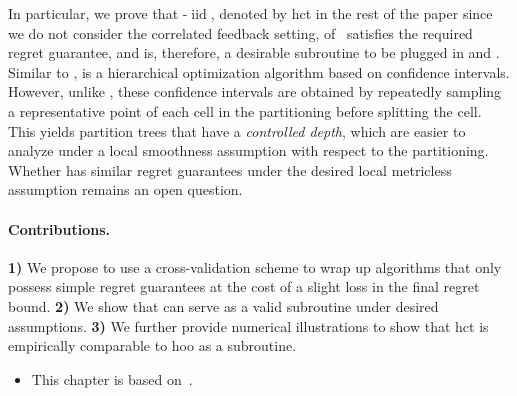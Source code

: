 In particular, we prove that \HCT-$\operatorname{iid}$, denoted by \gls{hct} in the rest of the paper since we do not consider the correlated feedback setting, of~\cite{azar2014online} satisfies the required regret guarantee, and is, therefore, a desirable subroutine to be plugged in \POO{} and \GPO{}. Similar to \HOO{}, \HCT{} is a hierarchical optimization algorithm based on confidence intervals. However, unlike \HOO{}, these confidence intervals are obtained by repeatedly sampling a representative point of each cell in the partitioning before splitting the cell. This yields partition trees that have a \emph{controlled depth}, which are easier to analyze under a local smoothness assumption with respect to the partitioning. Whether \HOO{} has similar regret guarantees under the desired local metricless assumption remains an open question.

\paragraph{Contributions.}
\textbf{1)} We propose to use a cross-validation scheme to wrap up algorithms that only possess simple regret guarantees at the cost of a slight loss in the final regret bound.
\textbf{2)} We show that \HCT{} can serve as a valid subroutine under desired assumptions.
\textbf{3)} We further provide numerical illustrations to show that \gls{hct} is empirically comparable to \gls{hoo} as a subroutine.




\medskip

\begin{itemize}[label=]
    \item This chapter is based on~\cite{shang2019adaptive,shang2018adaptive}.
\end{itemize}


